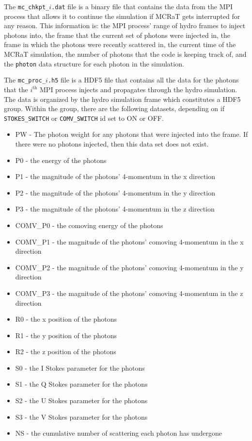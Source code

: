 \documentclass[12pt,a4paper]{article}
\begin{document}
The \texttt{mc\_chkpt\_$i$.dat} file is a binary file that contains the data from the MPI process that allows it to continue the simulation if MCRaT gets interrupted for any reason. This information is: the MPI process' range of hydro frames to inject photons into, the frame that the current set of photons were injected in, the frame in which the photons were recently scattered in, the current time of the MCRaT simulation, the number of photons that the code is keeping track of, and the \texttt{photon} data structure for each photon in the simulation.

The \texttt{mc\_proc\_$i$.h5} file is a HDF5 file that contains all the data for the photons that the $i^\mathrm{th}$ MPI process injects and propagates through the hydro simulation. The data is organized by the hydro simulation frame which constitutes a HDF5 group. Within the group, there are the following datasets, depending on if \texttt{STOKES\_SWITCH} or \texttt{COMV\_SWITCH} id set to ON or OFF.
\begin{itemize}
\item PW - The photon weight for any photons that were injected into the frame. If there were no photons injected, then this data set does not exist.
\item P0 - the energy of the photons
\item P1 - the magnitude of the photons' 4-momentum in the x direction
\item P2 - the magnitude of the photons' 4-momentum in the y direction 
\item P3 - the magnitude of the photons' 4-momentum in the z direction
\item COMV\_P0 - the comoving energy of the photons
\item COMV\_P1 - the magnitude of the photons' comoving 4-momentum in the x direction
\item COMV\_P2 - the magnitude of the photons' comoving 4-momentum in the y direction 
\item COMV\_P3 - the magnitude of the photons' comoving 4-momentum in the z direction
\item R0 - the x position of the photons
\item R1 - the y position of the photons
\item R2 - the z position of the photons
\item S0 - the I Stokes parameter for the photons
\item S1 - the Q Stokes parameter for the photons
\item S2 - the U Stokes parameter for the photons
\item S3 - the V Stokes parameter for the photons
\item NS - the cumulative number of scattering each photon has undergone
\end{itemize}
\end{document}
